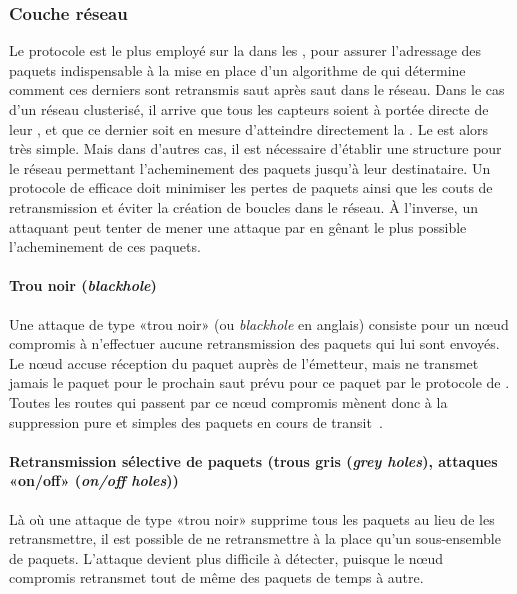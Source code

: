     \subsubsection{Couche réseau}
Le protocole \ip est le plus employé sur la  dans les \rcs, pour assurer l'adressage des paquets indispensable à la mise en place d'un algorithme de  qui détermine comment ces derniers sont retransmis saut après saut dans le réseau.
Dans le cas d'un réseau clusterisé, il arrive que tous les capteurs soient à portée directe de leur \ch, et que ce dernier soit en mesure d'atteindre directement la \sdb.
Le  est alors très simple.
Mais dans d'autres cas, il est nécessaire d'établir une structure pour le réseau permettant l'acheminement des paquets jusqu'à leur destinataire.
Un protocole de  efficace doit minimiser les pertes de paquets ainsi que les couts de retransmission et éviter la création de boucles dans le réseau.
À l'inverse, un attaquant peut tenter de mener une attaque par \dds en gênant le plus possible l'acheminement de ces paquets.

        \paragraph{Trou noir (\textit{blackhole})}
Une attaque de type «trou noir» (ou \textit{blackhole} en anglais) consiste pour un nœud compromis à n'effectuer aucune retransmission des paquets qui lui sont envoyés.
Le nœud accuse réception du paquet auprès de l'émetteur, mais ne transmet jamais le paquet pour le prochain saut prévu pour ce paquet par le protocole de .
Toutes les routes qui passent par ce nœud compromis mènent donc à la suppression pure et simples des paquets en cours de transit~\cite{Kar05}.

        \paragraph{Retransmission sélective de paquets (trous gris (\textit{grey holes}), attaques «on/off» (\textit{on/off holes}))}
Là où une attaque de type «trou noir»  supprime tous les paquets au lieu de les retransmettre, il est possible de ne retransmettre à la place qu'un sous-ensemble de paquets.
L'attaque devient plus difficile à détecter, puisque le nœud compromis retransmet tout de même des paquets de temps à autre.

